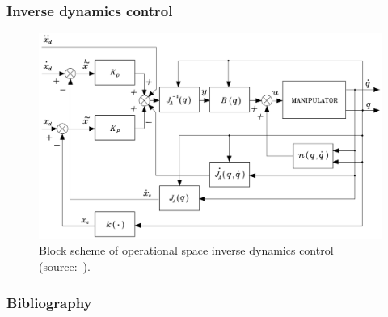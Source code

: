 \documentclass[10pt, aspectratio=169]{beamer}
\theoremstyle{remark}
\theoremstyle{definition}
\begin{document}
\begin{frame}[allowframebreaks]
\frametitle{Inverse dynamics control}

\begin{figure}
    \centering
    \includegraphics[width=0.7\linewidth]{images/inverse_dynamics_control_operational.png}
    \caption{Block scheme of operational space inverse dynamics control (source:~\cite{sciavicco2010robotics}).}
    \label{fig:inverse_dynamics_control_operational}
\end{figure}
    
\end{frame}



\begin{frame}[allowframebreaks]
\frametitle{Bibliography}
\printbibliography
\end{frame}
\end{document}
